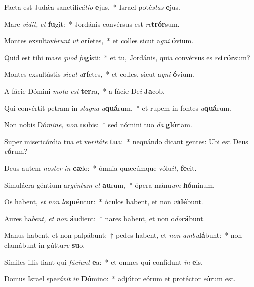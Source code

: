 \item Facta est Judǽa sanctifi\textit{cátio} \textbf{e}jus,~* Israel poté\tinyhspace\textit{stas} \textbf{e}jus.
\item Mare \textit{vidit,} \textit{et} \textbf{fu}git:~* Jordánis convérsus est \textit{re}\textbf{trór}sum.
\item Montes exsultavé\tinyhspace\textit{runt} \textit{ut} \textit{a}\textbf{rí}etes,~* et colles sicut a\textit{gni} \textbf{ó}vium.
\item Quid est tibi ma\tinyhspace\textit{re} \textit{quod} \textit{fu}\textbf{gí}sti:~* et tu, Jordánis, quia convérsus es \textit{re}\textbf{trór}sum?
\item Montes exsultástis \textit{sicut} \textit{a}\textbf{rí}etes,~* et colles, sicut a\textit{gni} \textbf{ó}vium.
\item A fácie Dómini \textit{mota} \textit{est} \textbf{ter}ra,~* a fácie De\textit{i} \textbf{Ja}cob.
\item Qui convértit petram in \textit{stagna} \textit{a}\textbf{quá}rum,~* et rupem in fontes \textit{a}\textbf{quá}rum.
\item Non nobis Dó\textit{mine,} \textit{non} \textbf{no}bis:~* sed nómini tuo \textit{da} \textbf{gló}riam.
\item Super misericórdia tua et ve\tinyhspace\textit{ritáte} \textbf{tu}a:~* nequándo dicant gentes: Ubi est Deus \textit{e}\textbf{ó}rum?
\item Deus autem \textit{noster} \textit{in} \textbf{cæ}lo:~* ómnia quæcúmque vólu\textit{it,} \textbf{fe}cit.
\item Simulácra géntium ar\textit{géntum} \textit{et} \textbf{au}rum,~* ópera mánu\textit{um} \textbf{hó}minum.
\item Os habent, \textit{et} \textit{non} \textit{lo}\textbf{quén}tur:~* óculos habent, et non \textit{vi}\textbf{dé}bunt.
\item Aures ha\tinyhspace\textit{bent,} \textit{et} \textit{non} \textbf{áu}dient:~* nares habent, et non o\textit{do}\textbf{rá}bunt.
\item Manus habent, et non palpábunt:~† pedes habent, et \textit{non} \textit{ambu}\textbf{lá}bunt:~* non clamábunt in gúttu\textit{re} \textbf{su}o.
\item Símiles illis fiant qui \textit{fáciunt} \textbf{e}a:~* et omnes qui confídunt \textit{in} \textbf{e}is.
\item Domus Israel spe\tinyhspace\textit{rávit} \textit{in} \textbf{Dó}mino:~* adjútor eórum et protéctor \textit{e}\textbf{ó}rum est.
